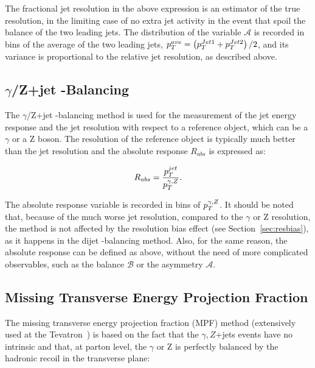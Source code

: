 The fractional jet \pt resolution in the above expression is an estimator of the true resolution, in the limiting case of no extra jet activity in the event that spoil the \pt balance of the two leading jets. The distribution of the variable $\mathcal{A}$ is recorded in bins of the average \pt of the two leading jets, $p_{{T}}^{{ave}}=\left(p_{{T}}^{{Jet}1}+p_{{T}}^{{Jet}2}\right)/2$, and its variance is proportional to the relative jet \pt resolution, as described above.


\subsection{$\gamma$/Z+jet \pt-Balancing}

The $\gamma$/Z+jet \pt-balancing method is used for the measurement of the jet energy response and the jet \pt resolution with respect to a reference object, which can be a $\gamma$ or a Z boson. The \pt resolution of the reference object is typically much better than the jet resolution and the absolute response $R_{abs}$ is expressed as: 

\begin{equation}
  R_{abs} = \frac{p_{{T}}^{jet}}{p_{{T}}^{\gamma,Z}}.
\end{equation}

The absolute response variable is recorded in bins of $p_{{T}}^{\gamma,Z}$. It should be noted that, because of the much worse jet \pt resolution, compared to the $\gamma$ or Z \pt resolution, the method is not affected by the resolution bias effect (see Section~\ref{sec:resbias}), as it happens in the dijet \pt-balancing method. Also, for the same reason, the absolute response can be defined as above, without the need of more complicated observables, such as the balance $\mathcal{B}$ or the asymmetry $\mathcal{A}$.


\subsection{Missing Transverse Energy Projection Fraction}

The missing transverse energy projection fraction (MPF) method (extensively used at the Tevatron~\cite{jes_d0}) is based on the fact that the $\gamma,Z$+jets events have no intrinsic \vecmet and that, at parton level, the $\gamma$ or Z is perfectly balanced by the hadronic recoil in the transverse plane:

